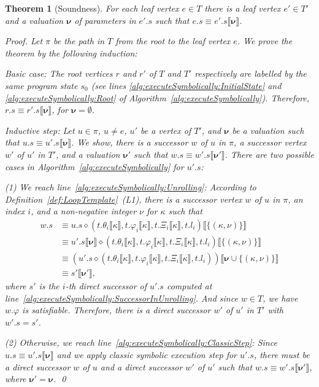 \documentclass{sig-alternate}%
\newtheorem{thm}{Theorem}%
\newcommand{\prm}[1]{\ensuremath{\llbracket #1 \rrbracket}}
\newcommand{\bld}[1]{\ensuremath{\boldsymbol{#1}}}
\newcommand{\compose}{\ensuremath{\diamond}}
\begin{document}
\begin{thm}[Soundness]
For each leaf vertex $e \in T$ there is a leaf vertex $e' \in T'$ and
a valuation  $\bld{\nu}$ of parameters in $e'.s$ such that $e.s \equiv
e'.s\prm{\bld{\nu}}$.
\begin{proof}
Let $\pi$ be the path in $T$ from the root to the leaf vertex $e$. We
prove the theorem by the following induction:

\emph{Basic case}: The root vertices $r$ and $r'$ of $T$ and $T'$
respectively are labelled by the same program state $s_0$ (see lines
\ref{alg:executeSymbolically:InitialState} and
\ref{alg:executeSymbolically:Root} of
Algorithm~\ref{alg:executeSymbolically}). Therefore, $r.s \equiv
r'.s\prm{\bld{\nu}}$, for $\bld{\nu} = \emptyset$.

\emph{Inductive step}: Let $u \in \pi$, $u \neq e$, $u'$ be a vertex
of $T'$, and $\bld{\nu}$ be a valuation such that $u.s \equiv
u'.s\prm{\bld{\nu}}$. We show, there is a successor $w$ of $u$ in
$\pi$, a successor vertex $w'$ of $u'$ in $T'$, and a valuation
$\bld{\nu}'$ such that $w.s \equiv w'.s\prm{\bld{\nu}'}$. There are
two possible cases in Algorithm~\ref{alg:executeSymbolically} for
$u'.s$:

(1) We reach line~\ref{alg:executeSymbolically:Unrolling}: According
to Definition~\ref{def:LoopTemplate}~(L1), there is a successor
vertex $w$ of $u$ in $\pi$, an index $i$, and a non-negative integer
$\nu$ for $\kappa$ such that
\begin{align*}
w.s &\equiv u.s \compose (t.\theta_i\prm{\kappa},
t.\varphi_i\prm{\kappa}, t.\Xi_i\prm{\kappa},
t.l_i)\prm{\{(\kappa,\nu)\}}
\\
&\equiv u'.s\prm{\bld{\nu}} \compose (t.\theta_i\prm{\kappa},
t.\varphi_i\prm{\kappa}, t.\Xi_i\prm{\kappa},
t.l_i)\prm{\{(\kappa,\nu)\}}
\\
&\equiv (u'.s \compose (t.\theta_i\prm{\kappa}, t.\varphi_i\prm{\kappa},
t.\Xi_i\prm{\kappa}, t.l_i))\prm{\bld{\nu} \cup \{(\kappa,\nu)\} }
\\
&\equiv s'\prm{\bld{\nu}'},
\end{align*}
where $s'$ is the $i$-th direct successor of $u'.s$ computed at
line~\ref{alg:executeSymbolically:SuccessorInUnrolling}. And since $w
\in T$, we have $w.\varphi$ is satisfiable. Therefore, there is a
direct successor $w'$ of $u'$ in $T'$ with $w'.s = s'$.

(2) Otherwise, we reach
line~\ref{alg:executeSymbolically:ClassicStep}: Since $u.s \equiv
u'.s\prm{\bld{\nu}}$ and we apply classic symbolic execution step for
$u'.s$, there must be a direct successor $w$ of $u$ and a direct
successor $w'$ of $u'$ such that $w.s \equiv w'.s\prm{\bld{\nu'}}$,
where $\bld{\nu'} = \bld{\nu}$.
\qed
\end{proof}
\end{thm}
\end{document}
